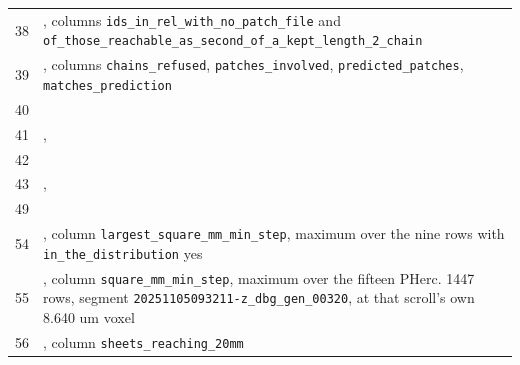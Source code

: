 \begin{xltabular}{\textwidth}{rX}
38 & \protect{}, columns \texttt{ids\_\allowbreak{}\allowbreak{}in\_\allowbreak{}\allowbreak{}rel\_\allowbreak{}\allowbreak{}with\_\allowbreak{}\allowbreak{}no\_\allowbreak{}\allowbreak{}patch\_\allowbreak{}\allowbreak{}file} and
\texttt{of\_\allowbreak{}\allowbreak{}those\_\allowbreak{}\allowbreak{}reachable\_\allowbreak{}\allowbreak{}as\_\allowbreak{}\allowbreak{}second\_\allowbreak{}\allowbreak{}of\_\allowbreak{}\allowbreak{}a\_\allowbreak{}\allowbreak{}kept\_\allowbreak{}\allowbreak{}length\_\allowbreak{}\allowbreak{}2\_\allowbreak{}\allowbreak{}chain} \\
39 & \protect{}, columns
\texttt{chains\_\allowbreak{}\allowbreak{}refused}, \texttt{patches\_\allowbreak{}\allowbreak{}involved}, \texttt{predicted\_\allowbreak{}\allowbreak{}patches}, \texttt{matches\_\allowbreak{}\allowbreak{}prediction} \\
40 & \protect{} \\
41 & \protect{}, \protect{} \\
42 & \protect{} \\
43 & \protect{},
\protect{} \\
49 & \protect{} \\
54 & \protect{}, column
  \texttt{largest\_\allowbreak{}\allowbreak{}square\_\allowbreak{}\allowbreak{}mm\_\allowbreak{}\allowbreak{}min\_\allowbreak{}\allowbreak{}step}, maximum over the nine rows with \texttt{in\_\allowbreak{}\allowbreak{}the\_\allowbreak{}\allowbreak{}distribution} yes \\
55 & \protect{}, column \texttt{square\_\allowbreak{}\allowbreak{}mm\_\allowbreak{}\allowbreak{}min\_\allowbreak{}\allowbreak{}step},
  maximum over the fifteen PHerc. 1447 rows, segment \texttt{20251105093211-\allowbreak{}z\_\allowbreak{}\allowbreak{}dbg\_\allowbreak{}\allowbreak{}gen\_\allowbreak{}\allowbreak{}00320}, at that
  scroll's own 8.640 um voxel \\
56 & \protect{}, column \texttt{sheets\_\allowbreak{}\allowbreak{}reaching\_\allowbreak{}\allowbreak{}20mm} \\

\end{xltabular}
